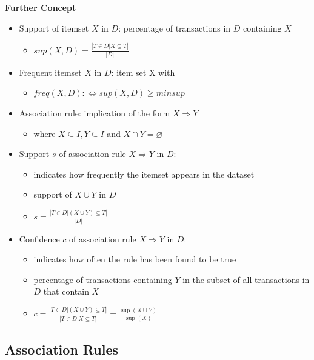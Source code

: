 \documentclass{article}
\begin{document}
\textbf{Further Concept}
\begin{itemize}
  \item Support of itemset $X$ in $D$: percentage of transactions in $D$ containing $X$
    \begin{itemize}
      \item $sup(X, D) = \frac{|{T \in D | X \subseteq T}|}{|D|}$
    \end{itemize}
  \item Frequent itemset $X$ in $D$: item set X with
    \begin{itemize}
      \item $freq(X, D) :\Leftrightarrow sup(X, D) \ge minsup$
    \end{itemize}
  \item Association rule: implication of the form $ X \Rightarrow Y$
    \begin{itemize}
      \item where $X \subseteq I, Y \subseteq I$ and $X \cap Y = \varnothing$
    \end{itemize}
  \item Support $s$ of association rule $X \Rightarrow Y$ in $D$:
    \begin{itemize}
      \item indicates how frequently the itemset appears in the dataset
      \item support of $X \cup Y$ in $D$
      \item $s = \frac{|{T \in D | (X \cup Y) \subseteq T}|}{|D|}$
    \end{itemize}
  \item Confidence $c$ of association rule $X \Rightarrow Y$ in $D$:
    \begin{itemize}
      \item indicates how often the rule has been found to be true
      \item percentage of transactions containing $Y$ in the subset of all transactions in $D$ that contain $X$
      \item $c = \frac{|{T \in D | (X \cup Y) \subseteq T}|}{|{T \in D | X \subseteq T}|} = \frac{\sup(X \cup Y)}{\sup(X)}$
    \end{itemize}
\end{itemize}

\newpage

\subsection{Association Rules}
\end{document}
